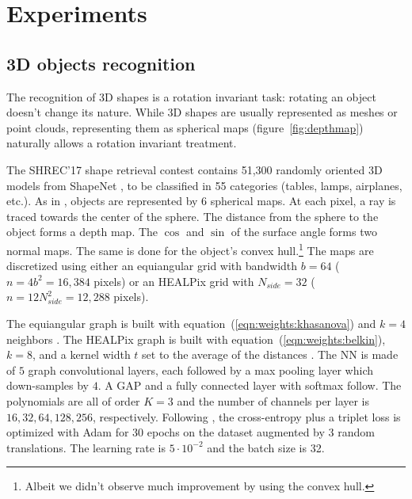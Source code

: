 \documentclass{article} %
\newcommand{\todo}[1]{{\color[rgb]{.6,.1,.6}{#1}}}
\newcommand{\figref}[1]{figure~\ref{fig:#1}}
\newcommand{\eqnref}[1]{equation~(\ref{eqn:#1})}
\begin{document}
\section{Experiments}


\subsection{3D objects recognition} \label{sec:exp:shrec}

The recognition of 3D shapes is a rotation invariant task: rotating an object doesn't change its nature.
While 3D shapes are usually represented as meshes or point clouds, representing them as spherical maps (\figref{depthmap}) naturally allows a rotation invariant treatment.

The SHREC'17 shape retrieval contest \citep{shrec17} contains 51,300 randomly oriented 3D models from ShapeNet \citep{shapenet}, to be classified in 55 categories (tables, lamps, airplanes, etc.).
As in \citep{cohen2018sphericalcnn}, objects are represented by 6 spherical maps.
At each pixel, a ray is traced towards the center of the sphere.
The distance from the sphere to the object forms a depth map.
The $\cos$ and $\sin$ of the surface angle forms two normal maps.
The same is done for the object's convex hull.\footnote{Albeit we didn't observe much improvement by using the convex hull.}
The maps are discretized using either an equiangular grid with bandwidth $b = 64$ ($n = 4 b^2 = 16,384$ pixels) or an HEALPix grid with $N_{side} = 32$ ($n = 12 N_{side}^2 = 12,288$ pixels).

The equiangular graph is built with \eqnref{weights:khasanova} and $k = 4$ neighbors \citep[following][]{khasanova2017sphericalcnn}.
The HEALPix graph is built with \eqnref{weights:belkin}, $k = 8$, and a kernel width $t$ set to the average of the distances \citep[following][]{perraudin2019deepspherecosmo}.
The NN is made of $5$ graph convolutional layers, each followed by a max pooling layer which down-samples by $4$.
A GAP and a fully connected layer with softmax follow.
The polynomials are all of order $K=3$ and the number of channels per layer is $16, 32, 64, 128, 256$, respectively.
Following \citet{esteves2018sphericalcnn}, the cross-entropy plus a triplet loss is optimized with Adam for 30 epochs on the dataset augmented by 3 random translations.
The learning rate is $5 \cdot 10^{-2}$ and the batch size is 32.
\end{document}
